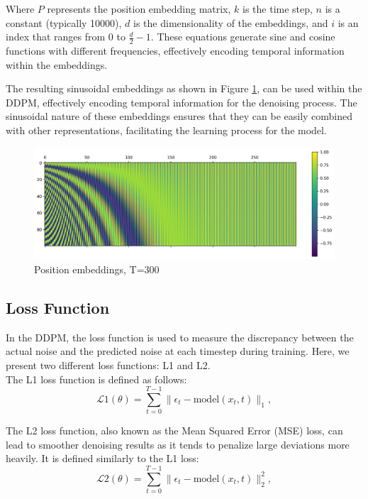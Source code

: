 \documentclass[letterpaper]{article} %
\begin{document}
Where $P$ represents the position embedding matrix, $k$ is the time step, $n$ is a constant (typically 10000), $d$ is the dimensionality of the embeddings, and $i$ is an index that ranges from 0 to $\frac{d}{2} - 1$. These equations generate sine and cosine functions with different frequencies, effectively encoding temporal information within the embeddings.

The resulting sinusoidal embeddings as shown in Figure \ref{fig:figure8}, can be used within the DDPM, effectively encoding temporal information for the denoising process. The sinusoidal nature of these embeddings ensures that they can be easily combined with other representations, facilitating the learning process for the model.

\begin{figure}[htbp]
    \centering
    \includegraphics[width=1.0\linewidth]{f8.png} %
    \caption{Position embeddings, T=300}
    \label{fig:figure8}
\end{figure}

\subsection{Loss Function}
In the DDPM, the loss function is used to measure the discrepancy between the actual noise and the predicted noise at each timestep during training. Here, we present two different loss functions: L1 and L2.\\

\noindent The L1 loss function is defined as follows:
\begin{equation}
\mathcal{L}{\text{1}}(\theta) = \sum_{t=0}^{T-1} \lVert \epsilon_t - \text{model}(x_t, t) \rVert_1,
\end{equation}
    
\noindent The L2 loss function, also known as the Mean Squared Error (MSE) loss, can lead to smoother denoising results as it tends to penalize large deviations more heavily. It is defined similarly to the L1 loss:
\begin{equation}
\mathcal{L}{\text{2}}(\theta) = \sum_{t=0}^{T-1} \lVert \epsilon_t - \text{model}(x_t, t) \rVert_2^2,
\end{equation}
\end{document}
